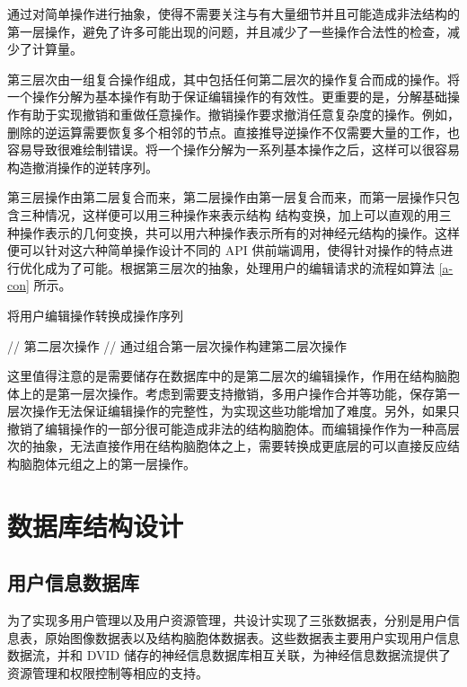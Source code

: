 通过对简单操作进行抽象，使得不需要关注与有大量细节并且可能造成非法结构的第一层操作，避免了许多可能出现的问题，并且减少了一些操作合法性的检查，减少了计算量。

第三层次由一组复合操作组成，其中包括任何第二层次的操作复合而成的操作。将一个操作分解为基本操作有助于保证编辑操作的有效性。更重要的是，分解基础操作有助于实现撤销和重做任意操作。撤销操作要求撤消任意复杂度的操作。例如，删除的逆运算需要恢复多个相邻的节点。直接推导逆操作不仅需要大量的工作，也容易导致很难绘制错误。将一个操作分解为一系列基本操作之后，这样可以很容易构造撤消操作的逆转序列。

第三层操作由第二层复合而来，第二层操作由第一层复合而来，而第一层操作只包含三种情况，这样便可以用三种操作来表示结构
结构变换，加上可以直观的用三种操作表示的几何变换，共可以用六种操作表示所有的对神经元结构的操作。这样便可以针对这六种简单操作设计不同的 API 供前端调用，使得针对操作的特点进行优化成为了可能。根据第三层次的抽象，处理用户的编辑请求的流程如算法 \ref{a-con} 所示。

\begin{algorithm}
  \caption{将用户编辑操作转换成操作序列}
  \begin{algorithmic}[1] %
              // 第二层次操作
    \ELSE
           // 通过组合第一层次操作构建第二层次操作
      \ENDWHILE
    \ENDIF
  \end{algorithmic}
  \label{a-con}
\end{algorithm}

这里值得注意的是需要储存在数据库中的是第二层次的编辑操作，作用在结构脑胞体上的是第一层次操作。考虑到需要支持撤销，多用户操作合并等功能，保存第一层次操作无法保证编辑操作的完整性，为实现这些功能增加了难度。另外，如果只撤销了编辑操作的一部分很可能造成非法的结构脑胞体。而编辑操作作为一种高层次的抽象，无法直接作用在结构脑胞体之上，需要转换成更底层的可以直接反应结构脑胞体元组之上的第一层操作。

\section{数据库结构设计}

\subsection{用户信息数据库}
为了实现多用户管理以及用户资源管理，共设计实现了三张数据表，分别是用户信息表，原始图像数据表以及结构脑胞体数据表。这些数据表主要用户实现用户信息数据流，并和 DVID 储存的神经信息数据库相互关联，为神经信息数据流提供了资源管理和权限控制等相应的支持。

